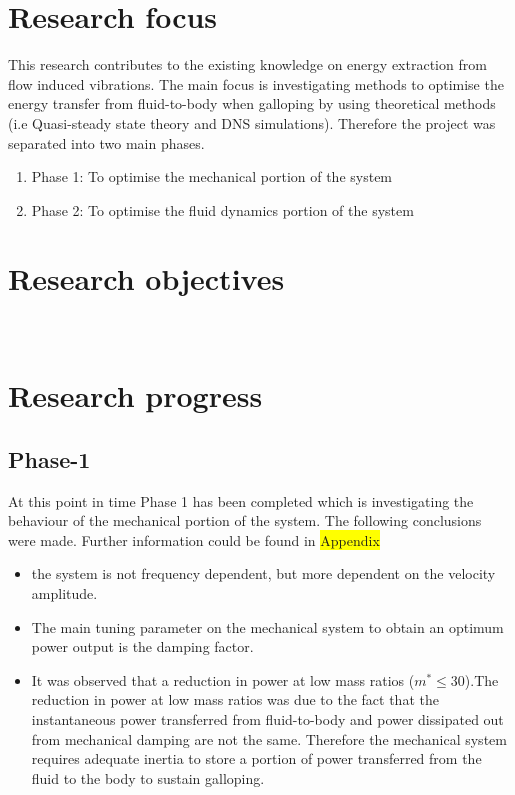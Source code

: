 \documentclass{article}
\newcommand{\hilight}[1]{\colorbox{yellow}{#1}}
\begin{document}
\section{Research focus}
 This research contributes to the existing knowledge on energy extraction from flow induced vibrations. The main focus is investigating methods to optimise the energy transfer from fluid-to-body when galloping by using theoretical methods (i.e Quasi-steady state theory and DNS simulations). Therefore the project was separated into two main phases.
 
\begin{enumerate}[]
\item Phase 1: To optimise the mechanical portion of the system 
\item Phase 2: To optimise the fluid dynamics portion of the system 
\end{enumerate}

\section{Research objectives}
\



\section{Research progress}

\subsection{Phase-1}

At this point in time  Phase 1 has been completed which is investigating the behaviour of the mechanical portion of the system. The following conclusions were made. Further information could be found in \hilight{Appendix}
\begin{itemize}
\item   the system is not frequency dependent, but more dependent on the velocity amplitude.
\end{itemize}

\begin{itemize}
\item The main tuning parameter on the mechanical system to obtain an optimum power output is the damping factor.
\end{itemize}

\begin{itemize}
\item It was observed that a reduction in power at low mass ratios ($m^*\leq30$).The reduction in power at low mass ratios was due to the fact that the instantaneous power transferred from fluid-to-body and power dissipated out from mechanical damping are not the same. Therefore the mechanical system requires adequate inertia to store a portion of power transferred from the fluid to the body to sustain galloping.
\end{itemize}
\end{document}
